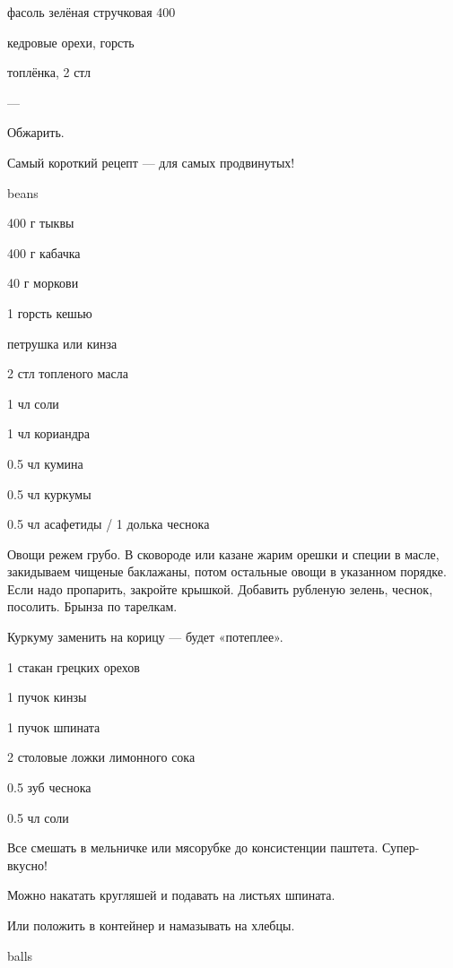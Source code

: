 {
\item фасоль зелёная стручковая 400
\item кедровые орехи, горсть
\item топлёнка, 2 стл
}{
\item ---
}{
Обжарить.
}{
\begin{advice}
\item Самый короткий рецепт — для самых продвинутых!
\end{advice}}{beans}



{
\item 400 г тыквы
\item 400 г кабачка
\item 40 г моркови
\item 1 горсть кешью
\item петрушка или кинза
\item 2 стл топленого масла
}{
\item 1 чл соли
\item 1 чл кориандра
\item 0.5 чл кумина
\item 0.5 чл куркумы
\item 0.5 чл асафетиды / 1 долька чеснока
}{
Овощи режем грубо. В сковороде или казане жарим орешки и специи в масле, закидываем чищеные баклажаны, потом остальные овощи в указанном порядке. Если надо пропарить, закройте крышкой. Добавить рубленую зелень, чеснок, посолить. Брынза по тарелкам.
}{
\begin{advice}
\item Куркуму заменить на корицу — будет «потеплее».
\end{advice}}{}



{
\item 1 стакан грецких орехов
\item 1 пучок кинзы
\item 1 пучок шпината
\item 2 столовые ложки лимонного сока
}{
\item 0.5 зуб чеснока
\item 0.5 чл соли
}{
Все смешать в мельничке или мясорубке до консистенции паштета. Супер-вкусно!
}{
\begin{advice}
\item Можно накатать кругляшей и подавать на листьях шпината.
\item Или положить в контейнер и намазывать на хлебцы.
\end{advice}}{balls}



